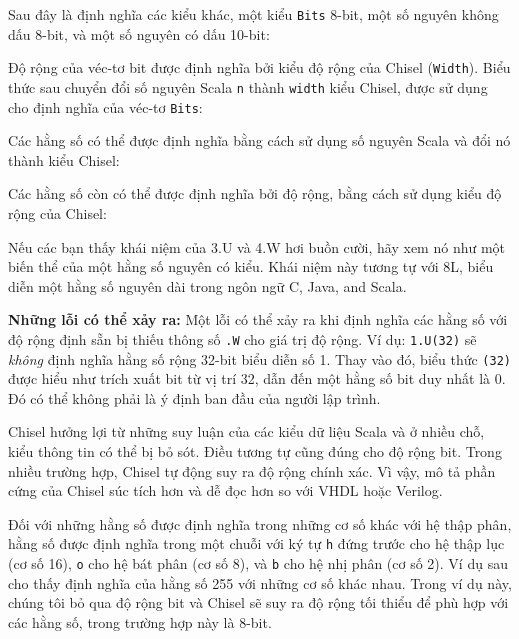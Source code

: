 \documentclass[%
    10pt,
    headinclude, footexclude,
    openright, %
    notitlepage,
    cleardoubleempty,
    headsepline,
    pointlessnumbers,
    bibtotoc, idxtotoc,
    ]{scrbook}
\newcommand{\code}[1]{{\small{\texttt{#1}}}}
\begin{document}
Sau đây là định nghĩa các kiểu khác, một kiểu \code{Bits} 8-bit, một số nguyên không dấu 8-bit, và một số nguyên có dấu 10-bit:


\noindent Độ rộng của véc-tơ bit được định nghĩa bởi kiểu độ rộng của Chisel (\code{Width}).
Biểu thức sau chuyển đổi số nguyên Scala \code{n} thành \code{width} kiểu Chisel,
được sử dụng cho định nghĩa của véc-tơ \code{Bits}:




\noindent Các hằng số có thể được định nghĩa bằng cách sử dụng số nguyên Scala và đổi nó thành kiểu Chisel:


\noindent Các hằng số còn có thể được định nghĩa bởi độ rộng, bằng cách sử dụng kiểu độ rộng của Chisel:


\noindent Nếu các bạn thấy khái niệm của 3.U và 4.W hơi buồn cười, hãy xem nó như một biến thể của một hằng số nguyên có kiểu. Khái niệm này tương tự với 8L, biểu diễn một hằng số nguyên dài trong ngôn ngữ C, Java, and Scala.

{\bf Những lỗi có thể xảy ra:} Một lỗi có thể xảy ra khi định nghĩa các hằng số với độ rộng định sẵn bị thiếu thông số \code{.W}
cho giá trị độ rộng. Ví dụ: \code{1.U(32)} sẽ \emph{không} định nghĩa hằng số rộng 32-bit biểu diễn số 1.
Thay vào đó, biểu thức \code{(32)} được hiểu như trích xuất bit từ vị trí 32, dẫn đến một hằng số bit duy nhất là 0. Đó có thể không phải là ý định ban đầu của người lập trình.


Chisel hưởng lợi từ những suy luận của các kiểu dữ liệu Scala và ở nhiều chỗ, kiểu thông tin có thể bị bỏ sót.
Điều tương tự cũng đúng cho độ rộng bit. Trong nhiều trường hợp, Chisel tự động suy ra độ rộng chính xác.
Vì vậy, mô tả phần cứng của Chisel súc tích hơn và dễ đọc hơn so với VHDL hoặc Verilog.

Đối với những hằng số được định nghĩa trong những cơ số khác với hệ thập phân, hằng số được định nghĩa trong một chuỗi với 
ký tự \code{h} đứng trước cho hệ thập lục (cơ số 16), \code{o} cho hệ bát phân (cơ số 8), và \code{b}
cho hệ nhị phân (cơ số 2). Ví dụ sau cho thấy định nghĩa của hằng số 255 với những cơ số khác nhau. 
Trong ví dụ này, chúng tôi bỏ qua độ rộng bit và Chisel sẽ suy ra độ rộng tối thiểu để phù hợp với các hằng số, trong trường hợp này là 8-bit.
\end{document}
